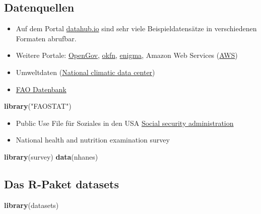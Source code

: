 \documentclass[]{article}
\newenvironment{Shaded}{\begin{snugshade}}{\end{snugshade}}
\newcommand{\KeywordTok}[1]{\textcolor[rgb]{0.13,0.29,0.53}{\textbf{{#1}}}}
\newcommand{\StringTok}[1]{\textcolor[rgb]{0.31,0.60,0.02}{{#1}}}
\newcommand{\NormalTok}[1]{{#1}}
\begin{document}
\subsection{Datenquellen}\label{datenquellen}

\begin{itemize}
\item
  Auf dem Portal \href{http://datahub.io/}{datahub.io} sind sehr viele
  Beispieldatensätze in verschiedenen Formaten abrufbar.
\item
  Weitere Portale: \href{http://ropengov.github.io/projects/}{OpenGov},
  \href{http://data.okfn.org/}{okfn},
  \href{https://app.enigma.io/table/org.worldbank.hnp.data}{enigma},
  Amazon Web Services
  (\href{http://aws.amazon.com/de/public-data-sets/}{AWS})
\item
  Umweltdaten
  (\href{http://www.ncdc.noaa.gov/ibtracs/index.php?name=ibtracs-data}{National
  climatic data center})
\item
  \href{http://cran.r-project.org/web/packages/FAOSTAT/index.html}{FAO
  Datenbank}
\end{itemize}

\begin{Shaded}
\begin{Highlighting}[]
\KeywordTok{library}\NormalTok{(}\StringTok{"FAOSTAT"}\NormalTok{)}
\end{Highlighting}
\end{Shaded}

\begin{itemize}
\item
  Public Use File für Soziales in den USA
  \href{http://www.ssa.gov/policy/docs/data/index.html}{Social security
  administration}
\item
  National health and nutrition examination survey
\end{itemize}

\begin{Shaded}
\begin{Highlighting}[]
\KeywordTok{library}\NormalTok{(survey)}
\KeywordTok{data}\NormalTok{(nhanes)}
\end{Highlighting}
\end{Shaded}

\subsection{Das R-Paket datasets}\label{das-r-paket-datasets}

\begin{Shaded}
\begin{Highlighting}[]
\KeywordTok{library}\NormalTok{(datasets)}
\end{Highlighting}
\end{Shaded}
\end{document}
